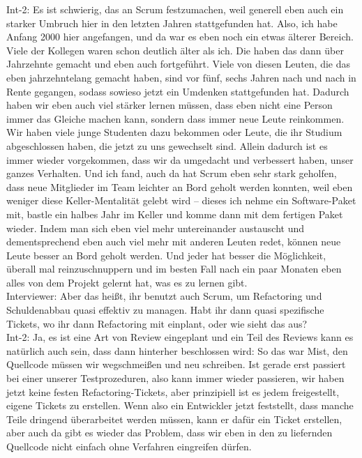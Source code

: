 Int-2: Es ist schwierig, das an Scrum festzumachen, weil generell eben auch ein starker Umbruch hier in den letzten Jahren stattgefunden hat. Also, ich habe Anfang 2000 hier angefangen, und da war es eben noch ein etwas älterer Bereich. Viele der Kollegen waren schon deutlich älter als ich. Die haben das dann über Jahrzehnte gemacht und eben auch fortgeführt. Viele von diesen Leuten, die das eben jahrzehntelang gemacht haben, sind vor fünf, sechs Jahren nach und nach in Rente gegangen, sodass sowieso jetzt ein Umdenken stattgefunden hat. Dadurch haben wir eben auch viel stärker lernen müssen, dass eben nicht eine Person immer das Gleiche machen kann, sondern dass immer neue Leute reinkommen. Wir haben viele junge Studenten dazu bekommen oder Leute, die ihr Studium abgeschlossen haben, die jetzt zu uns gewechselt sind. Allein dadurch ist es immer wieder vorgekommen, dass wir da umgedacht und verbessert haben, unser ganzes Verhalten. Und ich fand, auch da hat Scrum eben sehr stark geholfen, dass neue Mitglieder im Team leichter an Bord geholt werden konnten, weil eben weniger diese Keller-Mentalität gelebt wird – dieses ich nehme ein Software-Paket mit, bastle ein halbes Jahr im Keller und komme dann mit dem fertigen Paket wieder. Indem man sich eben viel mehr untereinander austauscht und dementsprechend eben auch viel mehr mit anderen Leuten redet, können neue Leute besser an Bord geholt werden. Und jeder hat besser die Möglichkeit, überall mal reinzuschnuppern und im besten Fall nach ein paar Monaten eben alles von dem Projekt gelernt hat, was es zu lernen gibt. \\
Interviewer: Aber das heißt, ihr benutzt auch Scrum, um Refactoring und Schuldenabbau quasi effektiv zu managen. Habt ihr dann quasi spezifische Tickets, wo ihr dann Refactoring mit einplant, oder wie sieht das aus?\\
Int-2: Ja, es ist eine Art von Review eingeplant und ein Teil des Reviews kann es natürlich auch sein, dass dann hinterher beschlossen wird: So das war Mist, den Quellcode müssen wir wegschmeißen und neu schreiben. Ist gerade erst passiert bei einer unserer Testprozeduren, also kann immer wieder passieren, wir haben jetzt keine festen Refactoring-Tickets, aber prinzipiell ist es jedem freigestellt, eigene Tickets zu erstellen. Wenn also ein Entwickler jetzt feststellt, dass manche Teile dringend überarbeitet werden müssen, kann er dafür ein Ticket erstellen, aber auch da gibt es wieder das Problem, dass wir eben in den zu liefernden Quellcode nicht einfach ohne Verfahren eingreifen dürfen. \\

